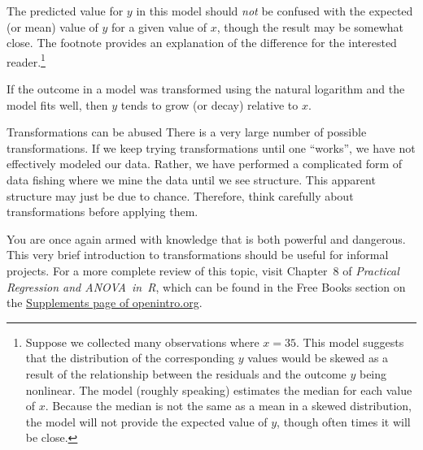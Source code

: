 The predicted value for $y$ in this model should \emph{not} be confused with the expected (or mean) value of $y$ for a given value of $x$, though the result may be somewhat close. The footnote provides an explanation of the difference for the interested reader.\footnote{Suppose we collected many observations where $x=35$. This model suggests that the distribution of the corresponding $y$ values would be skewed as a result of the relationship between the residuals and the outcome $y$ being nonlinear. The model (roughly speaking) estimates the median for each value of $x$. Because the median is not the same as a mean in a skewed distribution, the model will not provide the expected value of $y$, though often times it will be close.}

\begin{tipBox}{
If the outcome in a model was transformed using the natural logarithm and the model fits well, then $y$ tends to grow (or decay)  relative to $x$.} %
\end{tipBox}

\begin{caution}{Transformations can be abused}
{There is a very large number of possible transformations. If we keep trying transformations until one ``works'', we have not effectively modeled our data. Rather, we have performed a complicated form of data fishing where we mine the data until we see structure. This apparent structure may just be due to chance. Therefore, think carefully about transformations before applying them.}
\end{caution}

You are once again armed with knowledge that is both powerful and dangerous. This very brief introduction to transformations should be useful for informal projects. For a more complete review of this topic, visit Chapter~8 of \emph{Practical Regression and ANOVA~in~R}, which can be found in the Free Books section on the \href{http://www.openintro.org/stat/supplements.php?feature=regression_online_extra_more_free_books}{Supplements page of openintro.org}.


